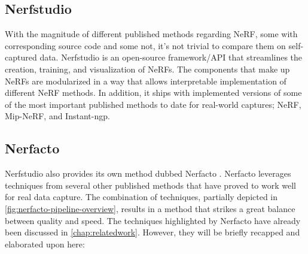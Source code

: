 



\subsection{Nerfstudio} \label{sec:nerfstudio}
With the magnitude of different published methods regarding NeRF, some with corresponding source code and some not, it's not trivial to compare them on self-captured data. Nerfstudio \cite{nerfstudio} is an open-source framework/API that streamlines the creation, training, and visualization of NeRFs. The components that make up NeRFs are modularized in a way that allows interpretable implementation of different NeRF methods. In addition, it ships with implemented versions of some of the most important published methods to date for real-world captures; NeRF, Mip-NeRF, and Instant-ngp.

\subsection{Nerfacto} \label{sec:nerfacto}
Nerfstudio also provides its own method dubbed Nerfacto \cite{nerfstudio}. Nerfacto leverages techniques from several other published methods that have proved to work well for real data capture. The combination of techniques, partially depicted in \autoref{fig:nerfacto-pipeline-overview}, results in a method that strikes a great balance between quality and speed. The techniques highlighted by Nerfacto have already been discussed in \autoref{chap:relatedwork}. However, they will be briefly recapped and elaborated upon here:



